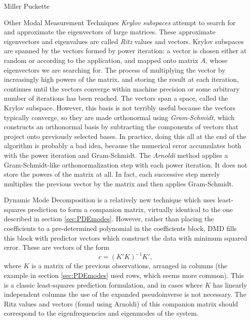 \documentclass[a4paper,10pt]{report}
\numberwithin{equation}{section}
\begin{document}
\begin{chapter}{Miller Puckette}
\begin{section}{Other Modal Measurement Techniques}
\emph{Krylov subspaces} attempt to search for and approximate the eigenvectors of large matrices. These approximate eigenvectors and eigenvalues are called \emph{Ritz} values and vectors. Krylov subspaces are spanned by the vectors formed by power iteration: a vector is chosen either at random or according to the application, and mapped onto matrix $A$, whose eigenvectors we are searching for. The process of multiplying the vector by increasingly high powers of the matrix, and storing the result at each iteration, continues until the vectors converge within machine precision or some arbitrary number of iterations has been reached. The vectors span a space, called the Krylov subspace. \cite[p.~428]{Watkins2010} However, this basis is not terribly useful because the vectors typically converge, so they are made orthonormal using \emph{Gram-Schmidt}, which constructs an orthonormal basis by subtracting the components of vectors that project onto previously selected bases. \cite[p.~234]{Strang2009} In practice, 
doing this all at the end of the algorithm is probably a bad idea, because the numerical error accumulates both with the power iteration and Gram-Schmidt. \cite[p.~439]{Watkins2010} The \emph{Arnoldi} method applies a Gram-Schmidt-like orthonormalization step with each power iteration. It does not store the powers of the matrix at all. In fact, each successive step merely multiplies the previous vector by the matrix and then applies Gram-Schmidt. \cite[p.~440]{Watkins2010} 

Dynamic Mode Decomposition \cite{Chen2012} is a relatively new technique which uses least-squares prediction to form a companion matrix, virtually identical to the one described in section \ref{sec:PDEmodes}. However, rather than placing the coefficients to a pre-determined polynomial in the coefficients block, DMD fills this block with predictor vectors which construct the data with minimum squared error. These are vectors of the form
\begin{equation}\label{normal_eq}
c = (K'  K)^{-1} K' , 
\end{equation}
where $K$ is a matrix of the previous observations, arranged in columns (the example in section \ref{sec:PDEmodes} used rows, which seems more common). This is a classic least-squares prediction formulation, and in cases where $K$ has linearly independent columns the use of the expanded pseudoinverse is not necessary. The Ritz values and vectors (found using Arnoldi) of this companion matrix should correspond to the eigenfrequencies and eigenmodes of the system. \cite{Chen2012}


\end{section}
\end{chapter}
\end{document}
